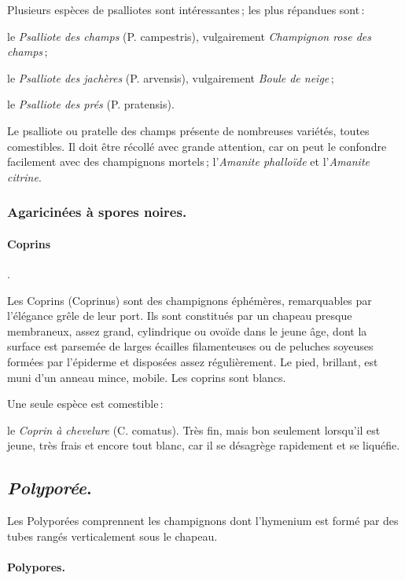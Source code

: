Plusieurs espèces de psalliotes sont intéressantes ; les plus répandues sont :

le \textit{Psalliote des champs} (P. campestris), vulgairement
\textit{Champignon rose des champs} ;

le \textit{Psalliote des jachères} (P. arvensis), vulgairement \textit{Boule de
neige} ;

le \textit{Psalliote des prés} (P. pratensis).

Le psalliote ou pratelle des champs présente de nombreuses variétés, toutes
comestibles. Il doit être récollé avec grande attention, car on peut le
confondre facilement avec des champignons mortels ; l'\textit{Amanite
phalloïde} et l'\textit{Amanite citrine}.

\subsubsection*{\centering \small\sc Agaricinées à spores noires.}

\paragraph{Coprins}.

Les Coprins (Coprinus) sont des champignons éphémères, remarquables par
l'élégance grêle de leur port. Ils sont constitués par un chapeau presque
membraneux, assez grand, cylindrique ou ovoïde dans le jeune âge, dont la
surface est parsemée de larges écailles filamenteuses ou de peluches soyeuses
formées par l'épiderme et disposées assez régulièrement. Le pied, brillant, est
muni d'un anneau mince, mobile. Les coprins sont blancs.

Une seule espèce est comestible :

le \textit{Coprin à chevelure} (C. comatus). Très fin, mais bon seulement
lorsqu'il est jeune, très frais et encore tout blanc, car il se désagrège
rapidement et se liquéfie.

\subsection*{\centering \textit{Polyporée}.}

Les Polyporées comprennent les champignons dont l'hymenium est formé par
des tubes rangés verticalement sous le chapeau.

\paragraph{Polypores.}

